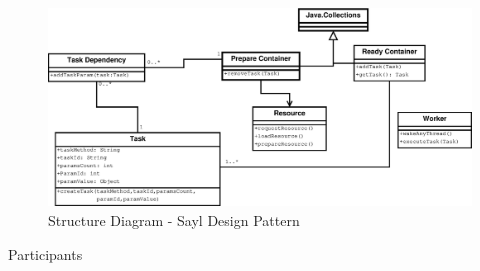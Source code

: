 \begin{figure}
	\centering
	\includegraphics*[width=1\textwidth, keepaspectratio=false]{fig/image25.eps}
	\caption{Structure Diagram - Sayl Design Pattern}
	\label{fig:str_diagram_sayl}
\end{figure}

\begin{description}
	\item[Participants]
\end{description}

